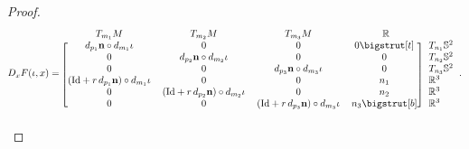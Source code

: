 \documentclass[11pt]{article}
\newcommand{\R}{\mathbb{R}}
\newcommand{\io}{\iota}
\newcommand{\nbf}{\mathbf{n}}
\newcommand{\Id}{\mathrm{Id}}
\newcommand\topstrut[1][1.2ex]{\setlength\bigstrutjot{#1}{\bigstrut[t]}}
\newcommand\botstrut[1][1.2ex]{\setlength\bigstrutjot{#1}{\bigstrut[b]}}
\theoremstyle{plain}
\theoremstyle{definition}
\theoremstyle{remark}
\begin{document}
\begin{proof}
		\begin{equation*}
			D_x F(\io, x) =
			\begin{blockarray}{cccc l}
				\begin{block}{cccc l}
					T_{m_1} M & T_{m_2} M & T_{m_3} M & ~~\R~~ & \\
				\end{block}
				\begin{block}{[cccc] l}
					d_{p_1} \nbf \circ d_{m_1} \io & 0 & 0 & 0 \topstrut  & T_{n_1} \mathbb{S}^2 \\
					0 & d_{p_2} \nbf \circ d_{m_2} \io & 0 & 0 & T_{n_2} \mathbb{S}^2   \\
					0 & 0 & d_{p_3} \nbf \circ d_{m_3} \io & 0 & T_{n_3} \mathbb{S}^2   \\
					(\Id + r \, d_{p_1} \nbf) \circ d_{m_1} \io & 0 & 0 & n_1 & \R^3 \\
					0 & (\Id + r \, d_{p_2} \nbf) \circ d_{m_2} \io & 0 & n_2 & \R^3  \\
					0 & 0 & (\Id + r \, d_{p_3} \nbf) \circ d_{m_3} \io  & n_3 \botstrut & \R^3  \\
				\end{block}
			\end{blockarray}.
		\end{equation*}
		

\end{proof}
\end{document}
